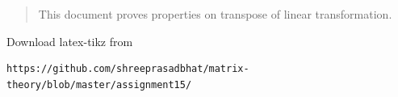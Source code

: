 \documentclass[journal,12pt,twocolumn]{IEEEtran}
\begin{document}
% 
\maketitle
\newpage
\bigskip
\renewcommand{\thefigure}{\theenumi}
\renewcommand{\thetable}{\theenumi}

%
%
\begin{abstract}
This document proves properties on transpose of linear transformation.
\end{abstract}
Download latex-tikz from
\begin{lstlisting}
https://github.com/shreeprasadbhat/matrix-theory/blob/master/assignment15/
\end{lstlisting}
%
\end{document}

